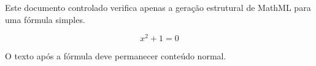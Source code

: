 \documentclass{abntexto-ufc}
\begin{document}
\textual

Este documento controlado verifica apenas a geração estrutural de MathML para uma fórmula simples.

\[
x^2 + 1 = 0
\]

O texto após a fórmula deve permanecer conteúdo normal.
\end{document}
